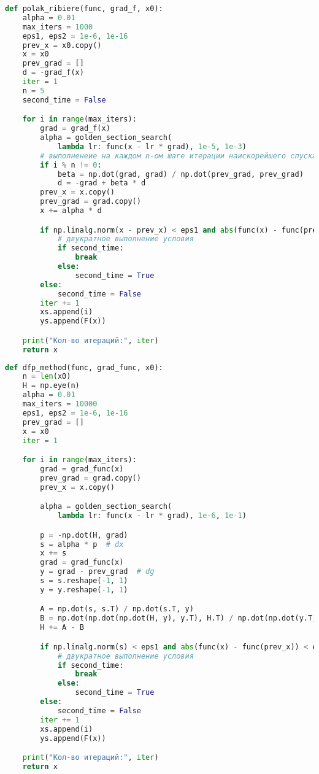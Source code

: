 \documentclass[a4paper, 14pt]{extarticle}
\begin{document}
\begin{lstlisting}[language=Python,caption={Метод Полака-Рибьера},label={lst:code2}]
def polak_ribiere(func, grad_f, x0):
    alpha = 0.01
    max_iters = 1000
    eps1, eps2 = 1e-6, 1e-16
    prev_x = x0.copy()
    x = x0
    prev_grad = []
    d = -grad_f(x)
    iter = 1
    n = 5
    second_time = False

    for i in range(max_iters):
        grad = grad_f(x)
        alpha = golden_section_search(
            lambda lr: func(x - lr * grad), 1e-5, 1e-3)
        # выполненеие на каждом n-ом шаге итерации наискорейшего спуска
        if i % n != 0:
            beta = np.dot(grad, grad) / np.dot(prev_grad, prev_grad)
            d = -grad + beta * d
        prev_x = x.copy()
        prev_grad = grad.copy()
        x += alpha * d

        if np.linalg.norm(x - prev_x) < eps1 and abs(func(x) - func(prev_x)) < eps2:
            # двукратное выполнение условия
            if second_time:
                break
            else:
                second_time = True
        else:
            second_time = False
        iter += 1
        xs.append(i)
        ys.append(F(x))

    print("Кол-во итераций:", iter)
    return x

\end{lstlisting}

\begin{lstlisting}[language=Python,caption={Метод Девидона-Флетчера-Пауэлла},label={lst:code3}]
def dfp_method(func, grad_func, x0):
    n = len(x0)
    H = np.eye(n)
    alpha = 0.01
    max_iters = 10000
    eps1, eps2 = 1e-6, 1e-16
    prev_grad = []
    x = x0
    iter = 1

    for i in range(max_iters):
        grad = grad_func(x)
        prev_grad = grad.copy()
        prev_x = x.copy()

        alpha = golden_section_search(
            lambda lr: func(x - lr * grad), 1e-6, 1e-1)

        p = -np.dot(H, grad)
        s = alpha * p  # dx
        x += s
        grad = grad_func(x)
        y = grad - prev_grad  # dg
        s = s.reshape(-1, 1)
        y = y.reshape(-1, 1)

        A = np.dot(s, s.T) / np.dot(s.T, y)
        B = np.dot(np.dot(np.dot(H, y), y.T), H.T) / np.dot(np.dot(y.T, H), y)
        H += A - B

        if np.linalg.norm(s) < eps1 and abs(func(x) - func(prev_x)) < eps2:
            # двукратное выполнение условия
            if second_time:
                break
            else:
                second_time = True
        else:
            second_time = False
        iter += 1
        xs.append(i)
        ys.append(F(x))

    print("Кол-во итераций:", iter)
    return x

\end{lstlisting}
\end{document}
